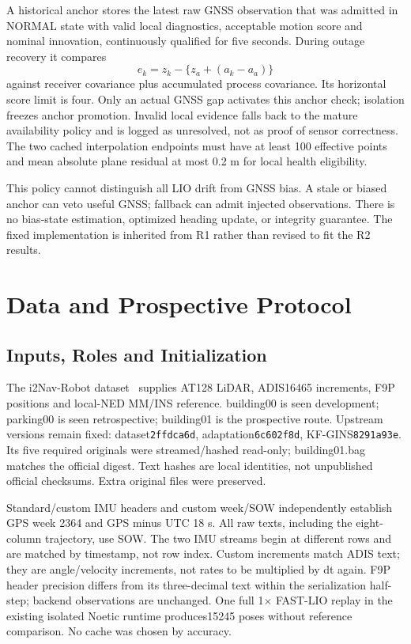 \documentclass[conference]{IEEEtran}
\begin{document}
A historical anchor stores the latest raw GNSS observation that was admitted in NORMAL state with valid local diagnostics, acceptable motion score and nominal innovation, continuously qualified for five seconds. During outage recovery it compares
\begin{equation}
 e_k=z_k-\{z_a+(a_k-a_a)\}
\end{equation}
against receiver covariance plus accumulated process covariance. Its horizontal score limit is four. Only an actual GNSS gap activates this anchor check; isolation freezes anchor promotion. Invalid local evidence falls back to the mature availability policy and is logged as unresolved, not as proof of sensor correctness. The two cached interpolation endpoints must have at least 100 effective points and mean absolute plane residual at most 0.2 m for local health eligibility.

This policy cannot distinguish all LIO drift from GNSS bias. A stale or biased anchor can veto useful GNSS; fallback can admit injected observations. There is no bias-state estimation, optimized heading update, or integrity guarantee. The fixed implementation is inherited from R1 rather than revised to fit the R2 results.


\section{Data and Prospective Protocol}
\subsection{Inputs, Roles and Initialization}
The i2Nav-Robot dataset~\cite{i2nav} supplies AT128 LiDAR, ADIS16465 increments, F9P positions and local-NED MM/INS reference. building00 is seen development; parking00 is seen retrospective; building01 is the prospective route. Upstream versions remain fixed: dataset\texttt{2ffdca6d}, adaptation\texttt{6c602f8d}, KF-GINS\texttt{8291a93e}. Its five required originals were streamed/hashed read-only; building01.bag matches the official digest. Text hashes are local identities, not unpublished official checksums. Extra original files were preserved.

Standard/custom IMU headers and custom week/SOW independently establish GPS week 2364 and GPS minus UTC 18 s. All raw texts, including the eight-column trajectory, use SOW. The two IMU streams begin at different rows and are matched by timestamp, not row index. Custom increments match ADIS text; they are angle/velocity increments, not rates to be multiplied by dt again. F9P header precision differs from its three-decimal text within the serialization half-step; backend observations are unchanged. One full 1$\times$ FAST-LIO replay in the existing isolated Noetic runtime produces15245 poses without reference comparison. No cache was chosen by accuracy.
\end{document}
